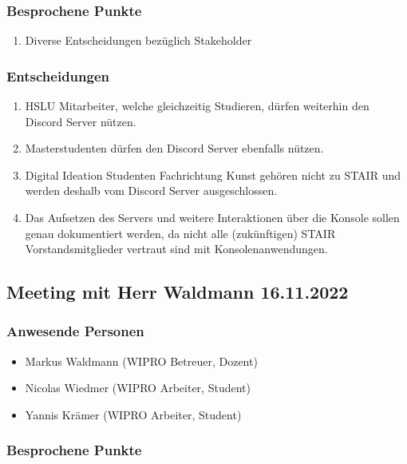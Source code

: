 \documentclass[a4paper, table]{article}
\begin{document}
\subsubsection*{Besprochene Punkte}

\begin{enumerate}
    \item Diverse Entscheidungen bezüglich Stakeholder
\end{enumerate}

\subsubsection*{Entscheidungen}

\begin{enumerate}
    \item HSLU Mitarbeiter, welche gleichzeitig Studieren, dürfen weiterhin den Discord Server nützen.
    \item Masterstudenten dürfen den Discord Server ebenfalls nützen.
    \item Digital Ideation Studenten Fachrichtung Kunst gehören nicht zu STAIR und werden deshalb vom Discord Server ausgeschlossen.
    \item Das Aufsetzen des Servers und weitere Interaktionen über die Konsole sollen genau dokumentiert werden, da nicht alle (zukünftigen) STAIR Vorstandsmitglieder vertraut sind mit Konsolenanwendungen.
\end{enumerate}

\newpage
\subsection{Meeting mit Herr Waldmann 16.11.2022}

\subsubsection*{Anwesende Personen}

\begin{itemize}
    \item Markus Waldmann (WIPRO Betreuer, Dozent)
    \item Nicolas Wiedmer (WIPRO Arbeiter, Student)
    \item Yannis Krämer (WIPRO Arbeiter, Student)
\end{itemize}

\subsubsection*{Besprochene Punkte}
\end{document}
